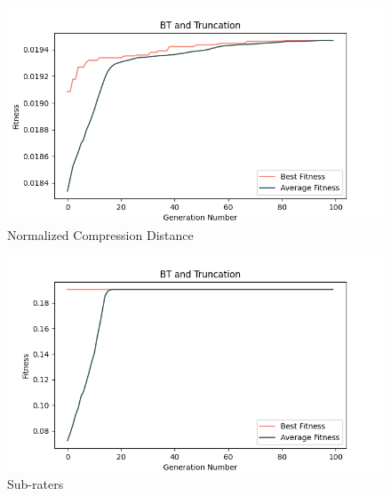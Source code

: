 \documentclass[conference]{IEEEtran}
\begin{document}
\begin{figure}[htbp]
\centerline{\includegraphics[scale = 0.5]{fitness2-100.png}}
\caption{Normalized Compression Distance}
\label{fig}
\end{figure}

\begin{figure}[htbp]
\centerline{\includegraphics[scale = 0.5]{fitness3-100.png}}
\caption{Sub-raters}
\label{fig}
\end{figure}
\end{document}
